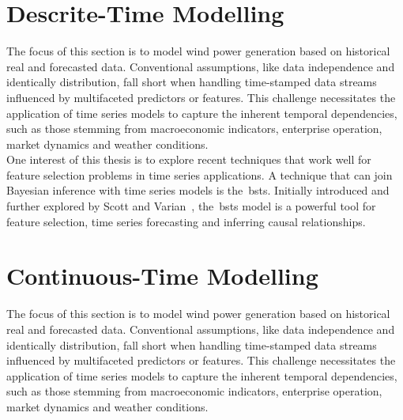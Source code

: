 
\section{Descrite-Time Modelling}
    \label{sec:desc_time}

    The focus of this section is to model wind power generation based on historical real and forecasted data.
    Conventional assumptions, like data independence and identically distribution, fall short when handling time-stamped
    data streams influenced by multifaceted predictors or features.
    This challenge necessitates the application of time series models to capture the inherent temporal dependencies,
    such as those stemming from macroeconomic indicators, enterprise operation, market dynamics and weather conditions.\\

    One interest of this thesis is to explore recent techniques that work well for feature selection problems in
    time series applications.
    A technique that can join Bayesian inference with time series models is the~\gls{bsts}.
    Initially introduced and further explored by Scott and Varian~\cite{scott_predicting_2013, scott_bayesian_2013},
    the~\gls{bsts} model is a powerful tool for feature selection, time series forecasting and inferring causal relationships. \\


\section{Continuous-Time Modelling}
    \label{sec:cont_time}

    The focus of this section is to model wind power generation based on historical real and forecasted data.
    Conventional assumptions, like data independence and identically distribution, fall short when handling time-stamped
    data streams influenced by multifaceted predictors or features.
    This challenge necessitates the application of time series models to capture the inherent temporal dependencies,
    such as those stemming from macroeconomic indicators, enterprise operation, market dynamics and weather conditions.\\

